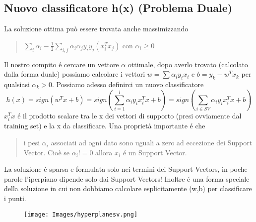 \documentclass{article}
\begin{document}
\subsection{Nuovo classificatore h(x) (Problema Duale)}
La soluzione ottima può essere trovata anche massimizzando
\begin{quote}
    $\sum_i \alpha_i - \frac{1}{2}\sum_{i,j} \alpha_i\alpha_j y_i y_j (x_i^T x_j)$ con $\alpha_i \geq 0$
\end{quote}
Il nostro compito é cercare un vettore $\alpha$ ottimale, dopo averlo trovato (calcolato dalla forma duale) possiamo calcolare i vettori $w=\sum \alpha_iy_ix_i$ e $b=y_k-w^Tx_k$ per qualsiasi $\alpha_k >0$. Possiamo adesso definirci un nuovo classificatore 
\begin{equation}
    h(x)=sign(w^Tx+b)=sign(\sum_{i=1}^l \alpha_iy_ix_i^Tx+b)=sign(\sum_{i \in SV} \alpha_iy_ix_i^T x+b)
\end{equation}
$x_i^Tx$ é il prodotto scalare tra le x dei vettori di supporto (presi ovviamente dal training set) e la x da classificare. \clearpage
Una proprietà importante é che
\begin{quote}
    i pesi $\alpha_i$ associati ad ogni dato sono uguali a zero ad eccezione dei Support Vector. Cioè se $\alpha_i!=0$ allora $x_i$ é un Support Vector.
\end{quote}
La soluzione é sparsa e formulata solo nei termini dei Support Vectors, in poche parole l'iperpiano dipende solo dai Support Vectors! Inoltre é una forma speciale della soluzione in cui non dobbiamo calcolare esplicitamente (w,b) per classificare i punti.
\begin{figure}[H]
\centering
\texttt{[image: Images/hyperplanesv.png]}
\end{figure}
\end{document}
